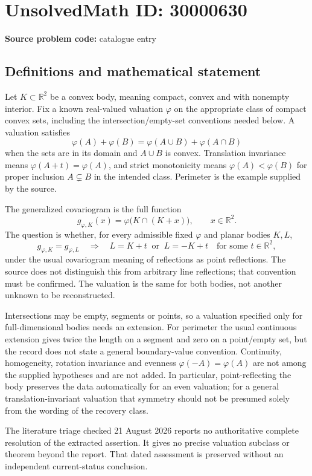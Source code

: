\documentclass[11pt]{article}
\newcommand{\R}{\mathbb{R}}
\begin{document}
\section*{UnsolvedMath ID: 30000630}
\textbf{Source problem code:} catalogue entry
\subsection{Definitions and mathematical statement}
Let $K\subset\R^2$ be a convex body, meaning compact, convex and with nonempty interior. Fix a known real-valued valuation $\varphi$ on the appropriate class of compact convex sets, including the intersection/empty-set conventions needed below. A valuation satisfies
\[
 \varphi(A)+\varphi(B)=\varphi(A\cup B)+\varphi(A\cap B)
\]
when the sets are in its domain and $A\cup B$ is convex. Translation invariance means $\varphi(A+t)=\varphi(A)$, and strict monotonicity means $\varphi(A)<\varphi(B)$ for proper inclusion $A\subsetneq B$ in the intended class. Perimeter is the example supplied by the source.

The generalized covariogram is the full function
\[
 g_{\varphi,K}(x)=\varphi\bigl(K\cap(K+x)\bigr),\qquad x\in\R^2.
\]
The question is whether, for every admissible fixed $\varphi$ and planar bodies $K,L$,
\[
 g_{\varphi,K}=g_{\varphi,L}
 \quad\Longrightarrow\quad
 L=K+t\ \text{ or }\ L=-K+t\quad\text{for some }t\in\R^2,
\]
under the usual covariogram meaning of reflections as point reflections. The source does not distinguish this from arbitrary line reflections; that convention must be confirmed. The valuation is the same for both bodies, not another unknown to be reconstructed.

Intersections may be empty, segments or points, so a valuation specified only for full-dimensional bodies needs an extension. For perimeter the usual continuous extension gives twice the length on a segment and zero on a point/empty set, but the record does not state a general boundary-value convention. Continuity, homogeneity, rotation invariance and evenness $\varphi(-A)=\varphi(A)$ are not among the supplied hypotheses and are not added. In particular, point-reflecting the body preserves the data automatically for an even valuation; for a general translation-invariant valuation that symmetry should not be presumed solely from the wording of the recovery class.

The literature triage checked 21 August 2026 reports no authoritative complete resolution of the extracted assertion. It gives no precise valuation subclass or theorem beyond the report. That dated assessment is preserved without an independent current-status conclusion.
\end{document}

